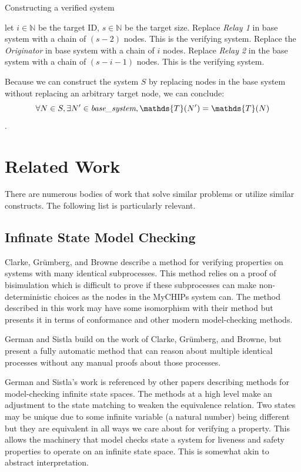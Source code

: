 \documentclass[runningheads]{llncs}
\newcommand{\basesystem}{\emph{base\_system}}
\newcommand{\tracestruc}[1]{\mathds{T}(#1)}
\newif\ifcomments
\newcommand{\krs}[1]{\ifcomments\textcolor{blue}{krs: #1}\fi}
\begin{document}
\begin{algorithm}
\caption{Constructing a verified system}
\label{alg:const_ver}
\begin{algorithmic}
\State let $i \in \mathds{N}$ be the target ID, $s \in \mathds{N}$ be the target size.
    \State Replace \emph{Relay 1} in base system with a chain of $(s - 2)$ nodes.
    \State This is the verifying system.
\Else
    \State Replace the \emph{Originator} in base system with a chain of $i$ nodes.
    \State Replace \emph{Relay 2} in the base system with a chain of $(s - i - 1)$ nodes. 
    \State This is the verifying system.
\EndIf
\end{algorithmic}
\end{algorithm}


Because we can construct the system $S$ by replacing nodes in the base system without replacing an arbitrary target node, we can conclude:
$$\forall N \in S, \exists N' \in \basesystem, \tracestruc{N'} = \tracestruc{N}$$.

\section{Related Work}
\krs{Need to add sections about other results that use conformance, as well as infinite state model checking}


There are numerous bodies of work that solve similar problems or utilize similar constructs. The following list is particularly relevant. 

\subsection{Infinate State Model Checking}
Clarke, Grümberg, and Browne describe a method for verifying properties on systems with many identical subprocesses. This method relies on a proof of bisimulation which is difficult to prove if these subprocesses can make non-deterministic choices as the nodes in the MyCHIPs system can. The method described in this work may have some isomorphism with their method but presents it in terms of conformance and other modern model-checking methods. 

German and Sistla build on the work of Clarke, Grümberg, and Browne, but present a fully automatic method that can reason about multiple identical processes without any manual proofs about those processes. 

German and Sistla's work is referenced by other papers describing methods for model-checking infinite state spaces. The methods at a high level make an adjustment to the state matching to weaken the equivalence relation. Two states may be unique due to some infinite variable (a natural number) being different but they are equivalent in all ways we care about for verifying a property. This allows the machinery that model checks state a system for liveness and safety properties to operate on an infinite state space. This is somewhat akin to abstract interpretation. 
\end{document}
